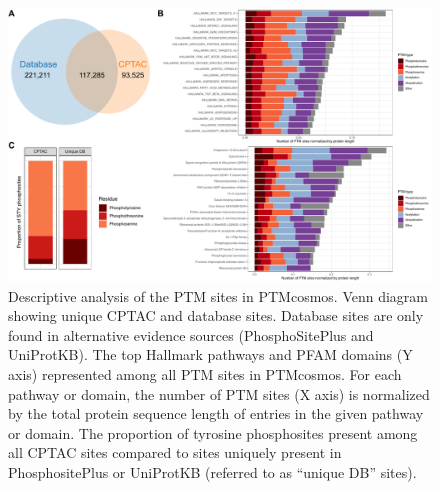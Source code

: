 \begin{figure}[tbp]
    \centering
    \includegraphics[width=\linewidth]{figures/chap03_ptmcosmos/figure2_ptmcosmos_site_detail.pdf}
    \caption[Descriptive analysis of the PTM sites in PTMcosmos.]{%
        Descriptive analysis of the PTM sites in PTMcosmos.
        Venn diagram showing unique CPTAC and database sites. Database sites are only found in alternative evidence sources (PhosphoSitePlus and UniProtKB).
        The top Hallmark pathways and PFAM domains (Y axis) represented among all PTM sites in PTMcosmos. For each pathway or domain, the number of PTM sites (X axis) is normalized by the total protein sequence length of entries in the given pathway or domain.
        The proportion of tyrosine phosphosites present among all CPTAC sites compared to sites uniquely present in PhosphositePlus or UniProtKB (referred to as ``unique DB'' sites).
    }
    \label{fig:ptmcosmos-site-detail}
\end{figure}

